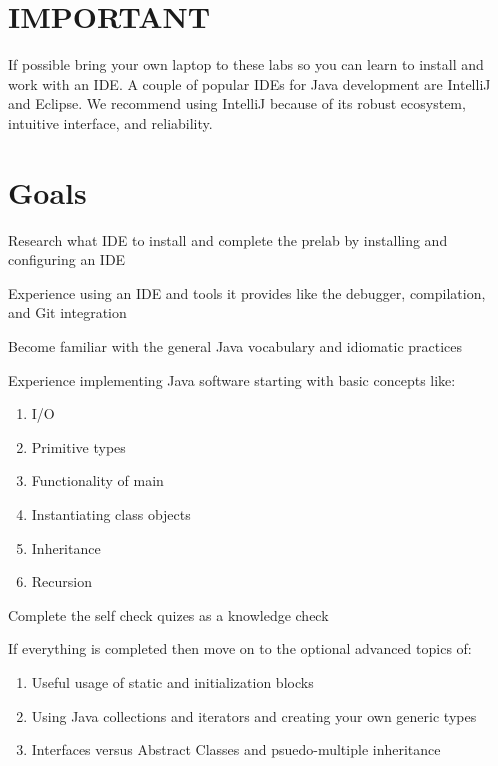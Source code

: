 \documentclass{article}
\begin{document}
\section{IMPORTANT}
If possible bring your own laptop to these labs so you can learn
to install and work with an IDE. A couple of popular IDEs for Java
development are IntelliJ and Eclipse. We recommend using IntelliJ
because of its robust ecosystem, intuitive interface, and reliability.

\section{Goals}

\begin{steps}
   \item Research what IDE to install and complete the prelab by installing and configuring an IDE
   \item Experience using an IDE and tools it provides like the debugger, compilation, and Git integration
   \item Become familiar with the general Java vocabulary and idiomatic practices
   \item Experience implementing Java software starting with basic concepts like:
   \begin{enumerate}[label=\Alph*.]
         \item I/O
         \item Primitive types
         \item Functionality of main
         \item Instantiating class objects
         \item Inheritance
         \item Recursion
      \end{enumerate}
   \item Complete the self check quizes as a knowledge check
   \item If everything is completed then move on to the optional advanced topics of:
   \begin{enumerate}[label=\Alph*.]
         \item Useful usage of static and initialization blocks
         \item Using Java collections and iterators and creating your own generic types
         \item Interfaces versus Abstract Classes and psuedo-multiple inheritance
      \end{enumerate}
\end{steps}
\end{document}
